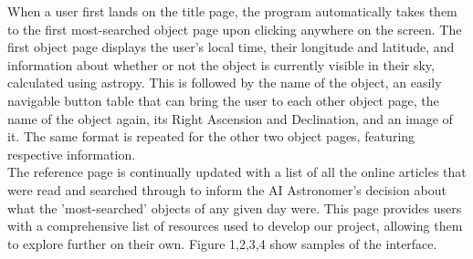 \documentclass[12pt,letterpaper]{article}
\begin{document}
\quad When a user first lands on the title page, the program automatically takes them to 
the first most-searched object page upon clicking anywhere on the screen. The first object 
page displays the user's local time, their longitude and latitude, and information about 
whether or not the object is currently visible in their sky, calculated using astropy. This 
is followed by the name of the object, an easily navigable button table that can bring the 
user to each other object page, the name of the object again, its Right Ascension and Declination, 
and an image of it. The same format is repeated for the other two object pages, featuring 
respective information. \\

\quad The reference page is continually updated with a list of all the online articles that 
were read and searched through to inform the AI Astronomer's decision about what the 'most-searched' 
objects of any given day were. This page provides users with a comprehensive list of resources 
used to develop our project, allowing them to explore further on their own. Figure 1,2,3,4 show samples of the interface.\\
\end{document}
